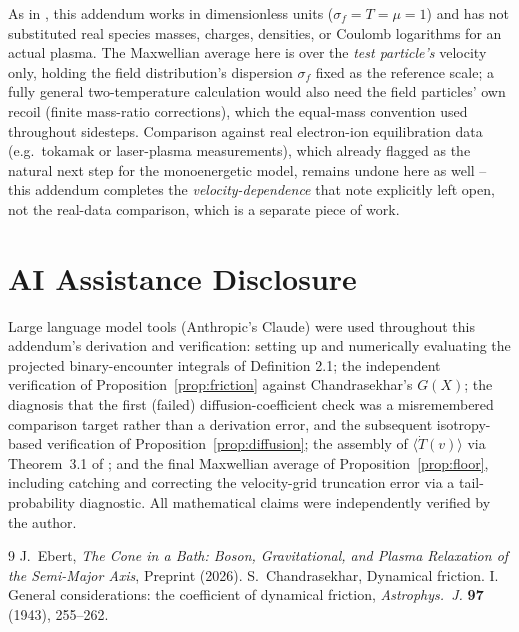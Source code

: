 \documentclass[12pt]{amsart}
\theoremstyle{plain}
\theoremstyle{remark}
\begin{document}
As in \cite{EbertBath2026}, this addendum works in dimensionless units ($\sigma_f=T=\mu=1$) and has not substituted real species masses, charges, densities, or Coulomb logarithms for an actual plasma. The Maxwellian average here is over the \emph{test particle's} velocity only, holding the field distribution's dispersion $\sigma_f$ fixed as the reference scale; a fully general two-temperature calculation would also need the field particles' own recoil (finite mass-ratio corrections), which the equal-mass convention used throughout sidesteps. Comparison against real electron-ion equilibration data (e.g.\ tokamak or laser-plasma measurements), which \cite{EbertBath2026} already flagged as the natural next step for the monoenergetic model, remains undone here as well -- this addendum completes the \emph{velocity-dependence} that note explicitly left open, not the real-data comparison, which is a separate piece of work.

\section*{AI Assistance Disclosure}

Large language model tools (Anthropic's Claude) were used throughout this addendum's derivation and verification: setting up and numerically evaluating the projected binary-encounter integrals of Definition 2.1; the independent verification of Proposition~\ref{prop:friction} against Chandrasekhar's $G(X)$; the diagnosis that the first (failed) diffusion-coefficient check was a misremembered comparison target rather than a derivation error, and the subsequent isotropy-based verification of Proposition~\ref{prop:diffusion}; the assembly of $\langle\dot T(v)\rangle$ via Theorem~3.1 of \cite{EbertBath2026}; and the final Maxwellian average of Proposition~\ref{prop:floor}, including catching and correcting the velocity-grid truncation error via a tail-probability diagnostic. All mathematical claims were independently verified by the author.

\begin{thebibliography}{9}
 J.~Ebert, \emph{The Cone in a Bath: Boson, Gravitational, and Plasma Relaxation of the Semi-Major Axis}, Preprint (2026).
 S.~Chandrasekhar, Dynamical friction. I. General considerations: the coefficient of dynamical friction, \emph{Astrophys.\ J.} \textbf{97} (1943), 255--262.
\end{thebibliography}
\end{document}

